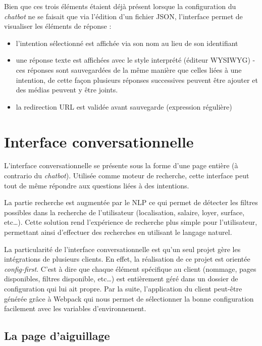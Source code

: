\documentclass[12pt,a4paper,oneside]{scrreprt}
\begin{document}
Bien que ces trois éléments étaient déjà présent lorsque la configuration du \textit{chatbot} ne se faisait que via l'édition d'un fichier JSON, l'interface permet de visualiser les éléments de réponse :
\begin{itemize}
	\item l'intention sélectionné est affichée via son nom au lieu de son identifiant
	\item une réponse texte est affichées avec le style interprété (éditeur WYSIWYG)
	\subitem - ces réponses sont sauvegardées de la même manière que celles liées à une intention, de cette façon plusieurs réponses successives peuvent être ajouter et des médias peuvent y être joints.
	\item la redirection URL est validée avant sauvegarde (expression régulière)
\end{itemize}

\section{Interface conversationnelle}

L'interface conversationnelle se présente sous la forme d'une page entière (à contrario du \textit{chatbot}). Utilisée comme moteur de recherche, cette interface peut tout de même répondre aux questions liées à des intentions.

La partie recherche est augmentée par le NLP ce qui permet de détecter les filtres possibles dans la recherche de l'utilisateur (localisation, salaire, loyer, surface, etc\dots). Cette solution rend l'expérience de recherche plus simple pour l'utilisateur, permettant ainsi d'effectuer des recherches en utilisant le langage naturel.

La particularité de l'interface conversationnelle est qu'un seul projet gère les intégrations de plusieurs clients. En effet, la réalisation de ce projet est orientée \textit{config-first}. C'est à dire que chaque élément spécifique au client (nommage, pages disponibles, filtres disponible, etc\dots) est entièrement géré dans un dossier de configuration qui lui ait propre. Par la suite, l'application du client peut-être générée grâce à Webpack qui nous permet de sélectionner la bonne configuration facilement avec les variables d'environnement.

\subsection{La page d'aiguillage}
\end{document}
